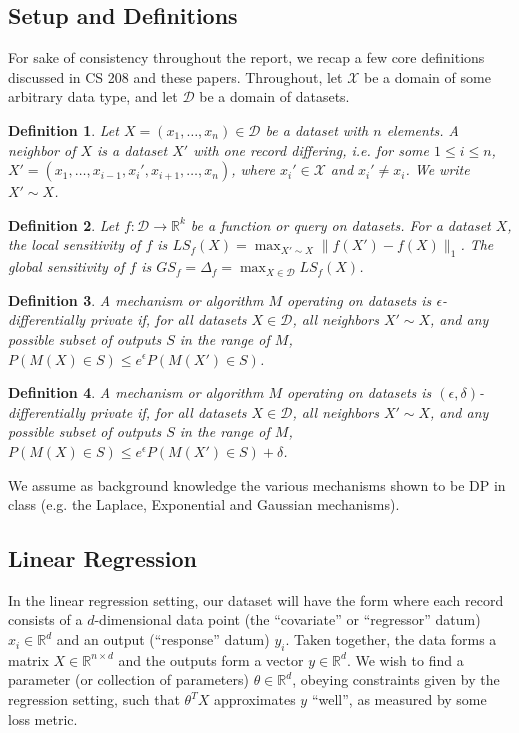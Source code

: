 \documentclass[11pt,conference]{IEEEtran}
\begin{document}
\subsection{Setup and Definitions} For sake of consistency throughout the report, we recap a few core definitions discussed in CS 208 and these papers. Throughout, let $\mathcal{X}$ be a domain of some arbitrary data type, and let $\mathcal{D}$ be a domain of datasets.

\newtheorem{definition}{\textbf{Definition}}
\begin{definition} Let $X=(x_1,\dots,x_n)\in \mathcal{D}$ be a dataset with $n$ elements. A neighbor of $X$ is a dataset $X'$ with one record differing, i.e. for some $1\leq i\leq n$, $X'=(x_1,\dots,x_{i-1},x_i',x_{i+1},\dots,x_n)$, where $x_i'\in \mathcal{X}$ and $x_i'\neq x_i$. We write $X'\sim X$.
\end{definition}

\begin{definition} Let $f:\mathcal{D}\to \mathbb{R}^k$ be a function or query on datasets. For a dataset $X$, the local sensitivity of $f$ is $LS_f(X)=\max_{X'\sim X} \| f(X')-f(X)\|_1$. The global sensitivity of $f$ is $GS_f=\Delta_f=\max_{X\in \mathcal{D}} LS_f(X)$.
\end{definition}

\begin{definition}
A mechanism or algorithm $M$ operating on datasets is $\epsilon$-differentially private if, for all datasets $X\in \mathcal{D}$, all neighbors $X'\sim X$, and any possible subset of outputs $S$ in the range of $M$, $P(M(X)\in S)\leq e^\epsilon P(M(X')\in S)$.
\end{definition}

\begin{definition} 
A mechanism or algorithm $M$ operating on datasets is $(\epsilon,\delta)$-differentially private if, for all datasets $X\in \mathcal{D}$, all neighbors $X'\sim X$, and any possible subset of outputs $S$ in the range of $M$, $P(M(X)\in S)\leq e^\epsilon P(M(X')\in S)+\delta$.
\end{definition}

We assume as background knowledge the various mechanisms shown to be DP in class (e.g. the Laplace, Exponential and Gaussian mechanisms). 

\subsection{Linear Regression} In the linear regression setting, our dataset will have the form where each record consists of a $d$-dimensional data point (the ``covariate'' or ``regressor'' datum) $x_i\in \mathbb{R}^d$ and an output (``response'' datum) $y_i$. Taken together, the data forms a matrix $X\in \mathbb{R}^{n\times d}$ and the outputs form a vector $y\in \mathbb{R}^d$. We wish to find a parameter (or collection of parameters) $\theta\in \mathbb{R}^d$, obeying constraints given by the regression setting, such that $\theta^T X$ approximates $y$ ``well'', as measured by some loss metric.
\end{document}
